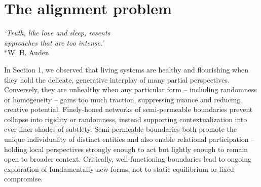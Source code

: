 \documentclass[12pt]{article}
\begin{document}









\section{The alignment problem}

\begin{center}
\textit{`Truth, like love and sleep, resents\\approaches that are too intense.'}\\*W. H. Auden
\end{center}


In Section 1, we observed that living systems are healthy and flourishing when they hold the delicate, generative interplay of many partial perspectives. Conversely, they are unhealthy when any particular form -- including randomness or homogeneity -- gains too much traction, suppressing nuance and reducing creative potential. Finely-honed networks of semi-permeable boundaries prevent collapse into rigidity or randomness, instead supporting contextualization into ever-finer shades of subtlety. Semi-permeable boundaries both promote the unique individuality of distinct entities and also enable relational participation -- holding local perspectives strongly enough to act but lightly enough to remain open to broader context. Critically, well-functioning boundaries lead to ongoing exploration of fundamentally new forms, not to static equilibrium or fixed compromise.
\end{document}
